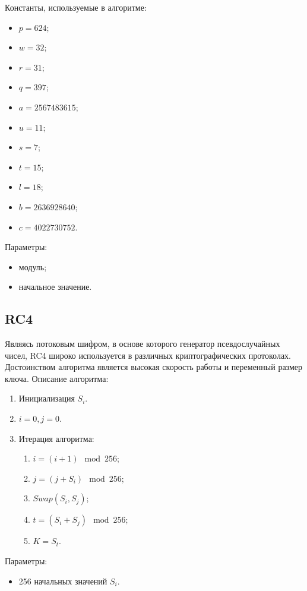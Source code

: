 \documentclass[bachelor, och, labwork]{SCWorks}
\begin{document}
Константы, используемые в алгоритме:
\begin{itemize}
  \item $p = 624$;
  \item $w = 32$;
  \item $r = 31$;
  \item $q = 397$;
  \item $a = 2567483615$;
  \item $u = 11$;
  \item $s = 7$;
  \item $t = 15$;
  \item $l = 18$;
  \item $b = 2636928640$;
  \item $c = 4022730752$.
\end{itemize}

Параметры:
\begin{itemize}
  \item модуль;
  \item начальное значение.
\end{itemize}

\subsection{RC4}
Являясь потоковым шифром, в основе которого генератор псевдослучайных чисел, RC4
широко используется в различных криптографических протоколах. Достоинством
алгоритма является высокая скорость работы и переменный размер ключа. Описание
алгоритма:
\begin{enumerate}
  \item Инициализация $S_i$.
  \item $i = 0, j = 0$.
  \item Итерация алгоритма:
    \begin{enumerate}
      \item $i = (i + 1) \mod 256$;
      \item $j = (j + S_i) \mod 256$;
      \item $Swap(S_i, S_j)$;
      \item $t = (S_i + S_j) \mod 256$;
      \item $K = S_t$.
    \end{enumerate}
\end{enumerate}

Параметры:
\begin{itemize}
  \item 256 начальных значений $S_i$.
\end{itemize}
\end{document}
